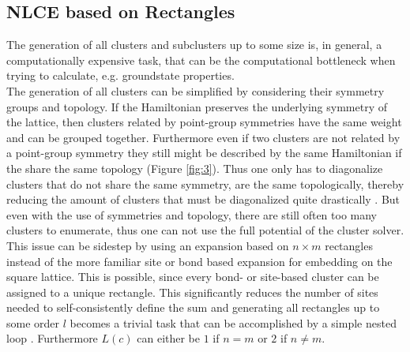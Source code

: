 \documentclass{article}
\begin{document}
\subsection{NLCE based on Rectangles}
The generation of all clusters and subclusters up to some size is, in
general, a computationally expensive task, that can be the
computational bottleneck when trying to calculate, e.g. groundstate
properties.\\
The generation of all clusters can be simplified by considering their
symmetry groups and topology. If the Hamiltonian preserves the underlying symmetry of the lattice,
then clusters related by point-group symmetries have the same weight
and can be grouped together. Furthermore even if two clusters are not
related by a point-group symmetry they still might be described by the
same Hamiltonian if the share the same topology (Figure \ref{fig:3}). Thus
one only has to diagonalize clusters that do not share the same
symmetry, are the same topologically, thereby reducing the amount of
clusters that must be diagonalized quite drastically \cite{Rigol}.
But even with the use of symmetries and topology, there are still
often too many clusters to enumerate, thus one can not use the full
potential of the cluster solver.\\
This issue can be sidestep by using an expansion based on $n \times m$
rectangles instead of the more familiar site or bond based
expansion for embedding on the square lattice. This is possible, since every bond- or site-based cluster
can be assigned to a unique rectangle. This significantly reduces the
number of sites needed to self-consistently define the sum and
generating all rectangles up to some order $l$ becomes a
trivial task that can be accomplished by a simple nested
loop \cite{Kallin}. Furthermore $L(c)$ can either be $1$ if $n=m$ or $2$ if $n
\neq m$.
\end{document}
